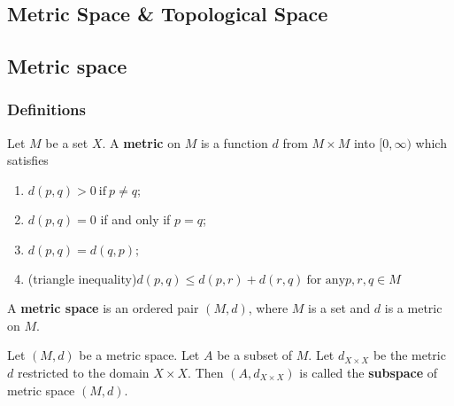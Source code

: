 \begin{refsection}

\startcontents[chapters]
\chapter{Metric Space \& Topological Space}\label{ch:metric-space}


\section{Metric space}

\subsection{Definitions}


\begin{definition} \cite[117]{johnsonbaugh2010foundations}
Let $M$ be a set $X$. A \textbf{metric} on $M$ is a function $d$ from $M\times M$ into $[0,\infty)$ which satisfies 
\begin{enumerate}
\item $d(p,q) > 0 ~\text{if}~ p \neq q;$
\item  $d(p,q)=0$ if and only if $p=q$;
\item $d(p,q) = d(q,p);$
\item (triangle inequality)$d(p,q) \leq d(p,r) + d(r,q) ~\text{for any} p,r,q \in M$
\end{enumerate}
\end{definition}

\begin{definition}\cite[117]{johnsonbaugh2010foundations}
A \textbf{metric space} is an ordered pair $(M,d)$, where $M$ is a set and $d$ is a metric on $M$.	
\end{definition}

\begin{definition}\label{metric space subspace}
Let $(M,d)$ be a metric space. Let $A$ be a subset of $M$. Let $d_{X\times X}$ be the metric $d$ restricted to the domain $X\times X$. Then $(A,d_{X\times X})$ is called the \textbf{subspace} of metric space $(M,d)$.
\end{definition}




\end{refsection}
